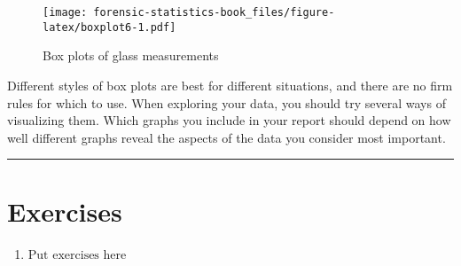 \documentclass[
]{book}
\providecommand{\tightlist}{%
  \setlength{\itemsep}{0pt}\setlength{\parskip}{0pt}}
\begin{document}
\begin{figure}
\centering
\texttt{[image: forensic-statistics-book\_files/figure-latex/boxplot6-1.pdf]}
\caption{\label{fig:boxplot6}Box plots of glass measurements}
\end{figure}

Different styles of box plots are best for different situations, and there are
no firm rules for which to use. When exploring your data, you should try several
ways of visualizing them. Which graphs you include in your report should depend
on how well different graphs reveal the aspects of the data you consider most
important.

\begin{center}\rule{0.5\linewidth}{0.5pt}\end{center}

\hypertarget{exercises-4}{%
\section{Exercises}\label{exercises-4}}

\begin{enumerate}
\def\labelenumi{\arabic{enumi}.}
\tightlist
\item
  \(\text{Put exercises here}\)
\end{enumerate}

  
\end{document}
